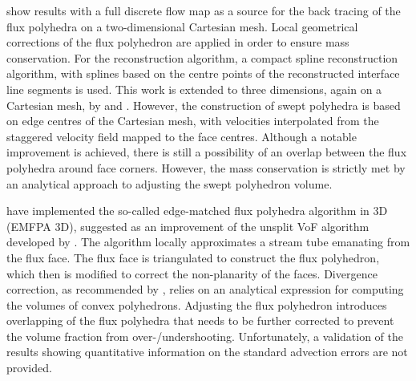 \citet{LopezEMFPA2004} show results with a full discrete flow map as a source
for the back tracing of the flux polyhedra on a two-dimensional Cartesian mesh.
Local geometrical corrections of the flux polyhedron are applied in order to
ensure mass conservation. For the reconstruction algorithm, a compact spline
reconstruction algorithm, with splines based on the centre points of the
reconstructed interface line segments is used. This work is extended to three
dimensions, again on a Cartesian mesh, by
\citet{HernandezLopezPart1Advection2008} and \citet{LopezPart2reconstruction}.
However, the construction of swept polyhedra is based on edge centres of the
Cartesian mesh, with velocities interpolated from the staggered velocity field
mapped to the face centres. Although a notable improvement is achieved, there
is still a possibility of an overlap between the flux polyhedra around face
corners. However, the mass conservation is strictly met by an analytical
approach to adjusting the swept polyhedron volume. 

\citet{IveyMoin2012} have implemented the so-called edge-matched flux polyhedra 
algorithm in 3D (EMFPA 3D), suggested as an improvement of the unsplit VoF 
algorithm developed by \citet{HernandezLopezPart1Advection2008}. %
The algorithm locally approximates a stream tube emanating from the flux face. 
The flux face is triangulated to construct the flux polyhedron, which then 
is modified to correct the non-planarity of the faces. Divergence correction, as 
recommended by \citet{HernandezLopezPart1Advection2008}, relies on an analytical 
expression for computing the volumes of convex polyhedrons. Adjusting the flux 
polyhedron introduces overlapping of the flux polyhedra that needs to be further 
corrected to prevent the volume fraction from over-/undershooting. Unfortunately, 
a validation of the results showing quantitative information on the standard 
advection errors are not provided.



